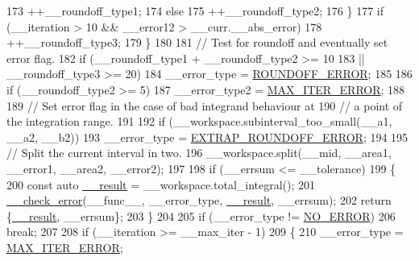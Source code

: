 \begin{DoxyCode}
173                     ++\_\_roundoff\_type1;
174                   \textcolor{keywordflow}{else}
175                     ++\_\_roundoff\_type2;
176                 \}
177               \textcolor{keywordflow}{if} (\_\_iteration > 10 && \_\_error12 > \_\_curr.\_\_abs\_error)
178                 ++\_\_roundoff\_type3;
179             \}
180 
181           \textcolor{comment}{// Test for roundoff and eventually set error flag.}
182           \textcolor{keywordflow}{if} (\_\_roundoff\_type1 + \_\_roundoff\_type2 >= 10
183               || \_\_roundoff\_type3 >= 20)
184             \_\_error\_type = \hyperlink{namespace____gnu__cxx_ad6c62dd86a596716cece6ac2d4cfd4b3a29574de87143c7715e9a138d7340e8ae}{ROUNDOFF\_ERROR};
185 
186           \textcolor{keywordflow}{if} (\_\_roundoff\_type2 >= 5)
187             \_\_error\_type2 = \hyperlink{namespace____gnu__cxx_ad6c62dd86a596716cece6ac2d4cfd4b3a420d46d10205dd953d0ccce5323afc4c}{MAX\_ITER\_ERROR};
188 
189           \textcolor{comment}{// Set error flag in the case of bad integrand behaviour at}
190           \textcolor{comment}{// a point of the integration range.}
191 
192           \textcolor{keywordflow}{if} (\_\_workspace.subinterval\_too\_small(\_\_a1, \_\_a2, \_\_b2))
193             \_\_error\_type = \hyperlink{namespace____gnu__cxx_ad6c62dd86a596716cece6ac2d4cfd4b3ac3b74f0b40291f29a3cb3a188412308b}{EXTRAP\_ROUNDOFF\_ERROR};
194 
195           \textcolor{comment}{// Split the current interval in two.}
196           \_\_workspace.split(\_\_mid, \_\_area1, \_\_error1, \_\_area2, \_\_error2);
197 
198           \textcolor{keywordflow}{if} (\_\_errsum <= \_\_tolerance)
199             \{
200               \textcolor{keyword}{const} \textcolor{keyword}{auto} \hyperlink{namespace____gnu__cxx_a500ea9f53aeaecd8c2ae657503450578}{\_\_result} = \_\_workspace.total\_integral();
201               \hyperlink{namespace____gnu__cxx_a370fd142548c2e9e39e69282b4603317}{\_\_check\_error}(\_\_func\_\_, \_\_error\_type, \hyperlink{namespace____gnu__cxx_a500ea9f53aeaecd8c2ae657503450578}{\_\_result}, \_\_errsum);
202               \textcolor{keywordflow}{return} \{\hyperlink{namespace____gnu__cxx_a500ea9f53aeaecd8c2ae657503450578}{\_\_result}, \_\_errsum\};
203             \}
204 
205           \textcolor{keywordflow}{if} (\_\_error\_type != \hyperlink{namespace____gnu__cxx_ad6c62dd86a596716cece6ac2d4cfd4b3ac31eecc280b10dec2efb4a2216ccc2e0}{NO\_ERROR})
206             \textcolor{keywordflow}{break};
207 
208           \textcolor{keywordflow}{if} (\_\_iteration >= \_\_max\_iter - 1)
209             \{
210               \_\_error\_type = \hyperlink{namespace____gnu__cxx_ad6c62dd86a596716cece6ac2d4cfd4b3a420d46d10205dd953d0ccce5323afc4c}{MAX\_ITER\_ERROR};

\end{DoxyCode}
